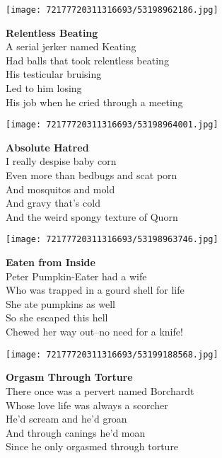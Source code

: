 \documentclass[10pt,letterpaper]{article}
\begin{document}
\begin{center}\texttt{[image: 72177720311316693/53198962186.jpg]}
\end{center}
\begin{center}
\textbf{Relentless Beating}\\
\vskip 0.2in
A serial jerker named Keating\\
Had balls that took relentless beating\\
His testicular bruising\\
Led to him losing\\
His job when he cried through a meeting\\
\end{center}
\pagebreak

\begin{center}\texttt{[image: 72177720311316693/53198964001.jpg]}
\end{center}
\begin{center}
\textbf{Absolute Hatred}\\
\vskip 0.2in
I really despise baby corn\\
Even more than bedbugs and scat porn\\
And mosquitos and mold\\
And gravy that's cold\\
And the weird spongy texture of Quorn\\
\end{center}
\pagebreak

\begin{center}\texttt{[image: 72177720311316693/53198963746.jpg]}
\end{center}
\begin{center}
\textbf{Eaten from Inside}\\
\vskip 0.2in
Peter Pumpkin-Eater had a wife\\
Who was trapped in a gourd shell for life\\
She ate pumpkins as well\\
So she escaped this hell\\
Chewed her way out--no need for a knife!\\
\end{center}
\pagebreak

\begin{center}\texttt{[image: 72177720311316693/53199188568.jpg]}
\end{center}
\begin{center}
\textbf{Orgasm Through Torture}\\
\vskip 0.2in
There once was a pervert named Borchardt\\
Whose love life was always a scorcher\\
He'd scream and he'd groan\\
And through canings he'd moan\\
Since he only orgasmed through torture\\
\end{center}
\pagebreak
\end{document}
